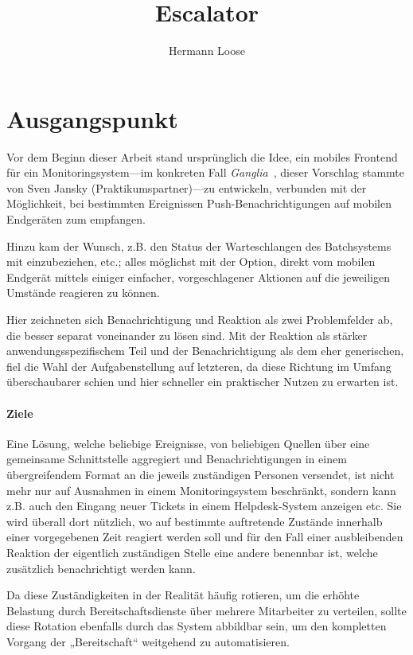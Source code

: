 \documentclass[11pt,utf8,notoc,bibnum,german,final]{zihpub}
\title{Escalator}
\author{Hermann Loose}
\begin{document}
\section{Ausgangspunkt}

Vor dem Beginn dieser Arbeit stand ursprünglich die Idee, ein mobiles Frontend
für ein Monitoringsystem—im konkreten Fall \emph{Ganglia}~\cite{ganglia},
dieser Vorschlag stammte von Sven Jansky (Praktikumspartner)—zu
entwickeln, verbunden mit der Möglichkeit, bei bestimmten Ereignissen
Push-Benach\-richti\-gungen auf mobilen Endgeräten zum empfangen.

Hinzu kam der Wunsch, z.B. den Status der Warteschlangen des Batchsystems mit
einzubeziehen, etc.; alles möglichst mit der Option, direkt vom mobilen
Endgerät mittels einiger einfacher, vorgeschlagener Aktionen auf die jeweiligen
Umstände reagieren zu können.

Hier zeichneten sich Benachrichtigung und Reaktion als zwei Problemfelder ab,
die besser separat voneinander zu lösen sind. Mit der Reaktion als stärker
anwendungsspezifischem Teil und der Benachrichtigung als dem eher generischen,
fiel die Wahl der Aufgabenstellung auf letzteren, da diese Richtung im Umfang
überschaubarer schien und hier schneller ein praktischer Nutzen zu erwarten
ist.

\paragraph{Ziele}

Eine Lösung, welche beliebige Ereignisse, von beliebigen Quellen über eine
gemeinsame Schnittstelle aggregiert und Benachrichtigungen in einem
übergreifendem Format an die jeweils zuständigen Personen versendet, ist nicht
mehr nur auf Ausnahmen in einem Monitoringsystem beschränkt, sondern kann z.B.
auch den Eingang neuer Tickets in einem Helpdesk-System anzeigen etc. Sie wird
überall dort nützlich, wo auf bestimmte auftretende Zustände innerhalb einer
vorgegebenen Zeit reagiert werden soll und für den Fall einer ausbleibenden
Reaktion der eigentlich zuständigen Stelle eine andere benennbar ist, welche
zusätzlich benachrichtigt werden kann.

Da diese Zuständigkeiten in der Realität häufig rotieren, um die erhöhte
Belastung durch Bereitschaftsdienste über mehrere Mitarbeiter zu verteilen,
sollte diese Rotation ebenfalls durch das System abbildbar sein, um den
kompletten Vorgang der „Bereitschaft“ weitgehend zu automatisieren.

\end{document}
